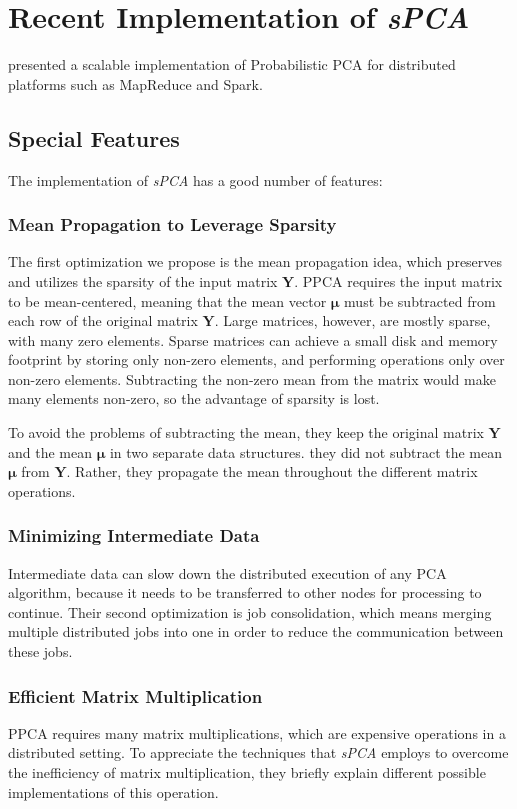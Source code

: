 \documentclass[10pt,conference,letterpaper]{IEEEtran}
\begin{document}
\section{Recent Implementation of \textit{sPCA}}
\cite{elgamal} presented a  scalable implementation of Probabilistic PCA for distributed platforms such as MapReduce and Spark. 
\subsection{Special Features}
The implementation of \textit{sPCA} has a good number of features:
\subsubsection{Mean Propagation to Leverage Sparsity}
The first optimization we propose is the mean propagation idea, which preserves and utilizes the sparsity of the input matrix $\pmb{Y}$. PPCA requires the input matrix to be mean-centered, meaning that the mean vector $\pmb{\mu}$ must be subtracted from each row of the original matrix $\pmb{Y}$. Large matrices, however, are mostly sparse, with many zero elements. Sparse matrices can achieve a small disk and memory footprint by storing only non-zero elements, and performing operations only over non-zero elements. Subtracting the non-zero mean from the matrix would make many elements non-zero, so the advantage of sparsity is lost.

To avoid the problems of subtracting the mean, they keep the original matrix $\pmb{Y}$ and the mean $\pmb{\mu}$ in two separate data structures. they did not subtract the mean $\pmb{\mu}$ from $\pmb{Y}$. Rather, they propagate the mean throughout the different matrix operations.
\subsubsection{Minimizing Intermediate Data}
Intermediate data can slow down the distributed execution of any PCA algorithm, because it needs to be transferred to other nodes for processing to continue. Their second optimization is job consolidation, which means merging multiple distributed jobs into one in order to reduce the communication between these jobs.
\subsubsection{Efficient Matrix Multiplication}
PPCA requires many matrix multiplications, which are expensive operations in a distributed setting. To appreciate the techniques that \textit{sPCA} employs to overcome the inefficiency of matrix multiplication, they briefly explain different possible implementations of this operation.
\end{document}
